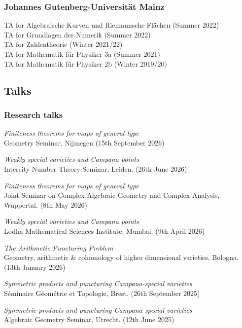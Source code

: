 \documentclass[paper=a4,fontsize=10pt,DIV=12,BCOR=3mm,pdftex]{scrartcl}
\begin{document}
\subsubsection*{Johannes Gutenberg-Universität Mainz}
TA for Algebraische Kurven und Riemannsche Flächen (Summer 2022) \\
TA for Grundlagen der Numerik (Summer 2022) \\
TA for Zahlentheorie (Winter 2021/22) \\
TA for Mathematik für Physiker 3a (Summer 2021) \\
TA for Mathematik für Physiker 2b (Winter 2019/20)



\subsection*{Talks}

\subsubsection*{Research talks}

\textit{Finiteness theorems for maps of general type} \\
Geometry Seminar, Nijmegen (15th September 2026)\medskip

\textit{Weakly special varieties and Campana points} \\
Intercity Number Theory Seminar, Leiden. (26th June 2026)\medskip

\textit{Finiteness theorems for maps of general type} \\
Joint Seminar on Complex Algebraic Geometry and Complex Analysis, Wuppertal. (8th May 2026)\medskip

\textit{Weakly special varieties and Campana points} \\
Lodha Mathematical Sciences Institute, Mumbai. (9th April 2026) \medskip

\textit{The Arithmetic Puncturing Problem} \\
Geometry, arithmetic \& cohomology of higher dimensional varieties, Bologna. (13th January 2026) \medskip

\textit{Symmetric products and puncturing Campana-special varieties} \\
Séminaire Géométrie et Topologie, Brest. (26th September 2025) \medskip

\textit{Symmetric products and puncturing Campana-special varieties} \\
Algebraic Geometry Seminar, Utrecht. (12th June 2025) \medskip
\end{document}
